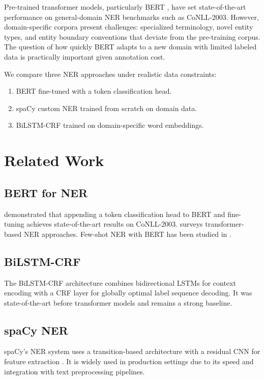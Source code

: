 \documentclass[conference]{IEEEtran}
\begin{document}
Pre-trained transformer models, particularly BERT \cite{devlin2018bert}, have set state-of-the-art performance on general-domain NER benchmarks such as CoNLL-2003. However, domain-specific corpora present challenges: specialized terminology, novel entity types, and entity boundary conventions that deviate from the pre-training corpus. The question of how quickly BERT adapts to a new domain with limited labeled data is practically important given annotation cost.

We compare three NER approaches under realistic data constraints:
\begin{enumerate}
\item BERT fine-tuned with a token classification head.
\item spaCy custom NER trained from scratch on domain data.
\item BiLSTM-CRF trained on domain-specific word embeddings.
\end{enumerate}

\section{Related Work}

\subsection{BERT for NER}
\cite{devlin2018bert} demonstrated that appending a token classification head to BERT and fine-tuning achieves state-of-the-art results on CoNLL-2003. \cite{li2020survey} surveys transformer-based NER approaches. Few-shot NER with BERT has been studied in \cite{huang2020few}.

\subsection{BiLSTM-CRF}
The BiLSTM-CRF architecture \cite{lample2016neural} combines bidirectional LSTMs for context encoding with a CRF layer for globally optimal label sequence decoding. It was state-of-the-art before transformer models and remains a strong baseline.

\subsection{spaCy NER}
spaCy's NER system uses a transition-based architecture with a residual CNN for feature extraction \cite{honnibal2017natural}. It is widely used in production settings due to its speed and integration with text preprocessing pipelines.
\end{document}

